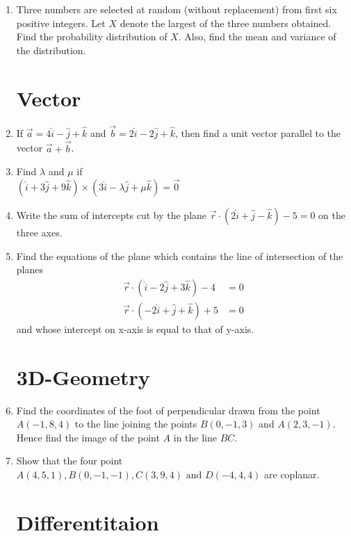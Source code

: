 \documentclass[10pt,-letter paper]{article}
\providecommand{\brak}[1]{\ensuremath{\left(#1\right)}}
\begin{document}
\begin{enumerate}
\item Three numbers are selected at random (without replacement) from first six positive integers. Let $X$ denote the largest of the three numbers obtained. Find the probability distribution of $X$. Also, find the mean and variance of the distribution.

\section{Vector}

\item If $\overrightarrow{a} = 4\hat{i} -\hat{j} + \hat{k}$ and $\overrightarrow{b} = 2\hat{i} -2\hat{j} + \hat{k} $, then find a unit vector parallel to the vector $\overrightarrow{a} + \overrightarrow{b} $.

\item Find $\lambda$ and $\mu$ if\\
$\brak{\hat{i} + 3\hat{j} + 9\hat{k}}\times\brak{3\hat{i} - \lambda\hat{j} + \mu\hat{k}} = \overrightarrow{0}$

\item Write the sum of intercepts cut by the plane $\overrightarrow{r}\cdot\brak{2\hat{i} + \hat{j} - \hat{k}} - 5 = 0$ on the three axes.

\item Find the equations of the plane which contains the line of intersection of the planes
\begin{align*}
	\overrightarrow{r}\cdot\brak{\hat{i} -2\hat{j} + 3\hat{k}}-4&=0\\
\overrightarrow{r}\cdot\brak{-2\hat{i} + \hat{j} + \hat{k}}+5&=0 
\end{align*}
and whose intercept on x-axis is equal to that of y-axis.

\section{3D-Geometry}

\item Find the coordinates of the foot of perpendicular drawn from the point $A\brak{-1,8,4}$ to the line joining the points $B\brak{0,-1,3}$ and $A\brak{2,3,-1}$. Hence find the image of the point $A$ in the line $BC$.

\item Show that the four point $A\brak{4, 5, 1}, B\brak{0,-1,-1}, C\brak{3,9,4} \text{ and } D\brak{-4,4,4}$ are coplanar.

\section{Differentitaion}


\end{enumerate}
\end{document}
